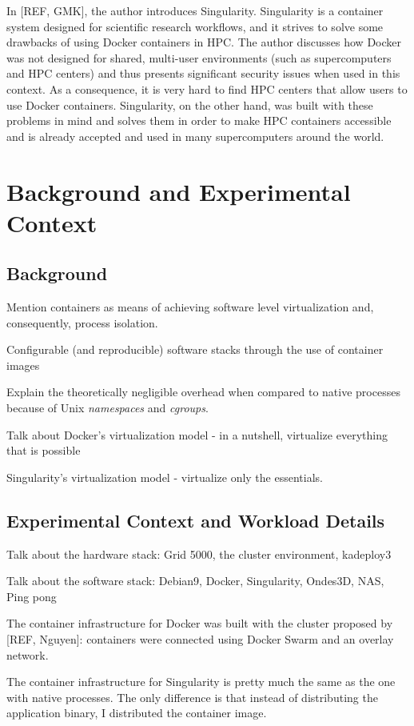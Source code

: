 \documentclass[12pt]{article}
\begin{document}
In [REF, GMK], the author introduces Singularity. Singularity is a container system designed for scientific research workflows, and it strives to solve some drawbacks of using Docker containers in HPC. The author discusses how Docker was not designed for shared, multi-user environments (such as supercomputers and HPC centers) and thus presents significant security issues when used in this context. As a consequence, it is very hard to find HPC centers that allow users to use Docker containers. Singularity, on the other hand, was built with these problems in mind and solves them in order to make HPC containers accessible and is already accepted and used in many supercomputers around the world.

\section{Background and Experimental Context}
\subsection{Background}
Mention containers as means of achieving software level virtualization and, consequently, process isolation.

Configurable (and reproducible) software stacks through the use of container images

Explain the theoretically negligible overhead when compared to native processes because of Unix \textit{namespaces} and \textit{cgroups}.

Talk about Docker's virtualization model - in a nutshell, virtualize everything that is possible

Singularity's virtualization model - virtualize only the essentials.

\subsection{Experimental Context and Workload Details}
Talk about the hardware stack: Grid 5000, the cluster environment, kadeploy3

Talk about the software stack: Debian9, Docker, Singularity, Ondes3D, NAS, Ping pong

The container infrastructure for Docker was built with the cluster proposed by [REF, Nguyen]: containers were connected using Docker Swarm and an overlay network.

The container infrastructure for Singularity is pretty much the same as the one with native processes. The only difference is that instead of distributing the application binary, I distributed the container image.
\end{document}
